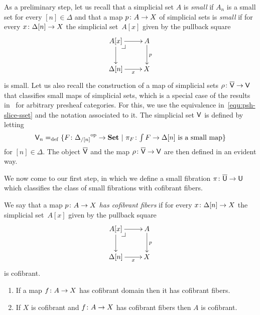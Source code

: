 \documentclass[reqno,10pt,a4paper,oneside,draft]{amsart}
\begin{document}
As a preliminary step, let us recall that a simplicial set $A$ is \emph{small}  if $A_n$ is a small set for every $[n] \in \Delta$ and that a map $p \colon A \to X$ of simplicial sets is \emph{small} if for every $x \colon \Delta[n] 
\to X$ the simplicial set~$A[x]$ given by the pullback square
\[
\xymatrix{
A[x] \ar[r] \ar[d] \drpullback & A \ar[d]^{p} \\
\Delta[n] \ar[r]_-{x} & X }
\]
is small. Let us also recall the  construction of a map of simplicial sets $\rho \colon \overline{\mathsf{V}} \to \mathsf{V}$ that classifies
small maps of simplicial sets, which is a special case of the results in~\cite{hofmann-streicher-universes} for arbitrary presheaf categories.  For this, we use the equivalence in~\eqref{equ:psh-slice-sset} and the notation associated to it.
The simplicial set $\mathsf{V}$ is defined by letting
\[
\mathsf{V}_n =_{\operatorname{def}} \{ F \colon {\Delta_{/[n]}}^{\operatorname{op}} \to \mathbf{Set} \ | \ \pi_F \colon \textstyle{\int F} \to \Delta[n] \text{ is a small
map} \}
\]
for $[n] \in \Delta$. The object $\overline{\mathsf{V}}$ and the map $\rho \colon \overline{\mathsf{V}} \to \mathsf{V}$ are then defined in an evident way. 


\bigskip

We now come to our first step, in which we define a small fibration $\pi \colon \overline{\mathsf{U}} \to \mathsf{U}$ which 
classifies the class of small fibrations with cofibrant fibers. 

\begin{definition} We say that a map $p \colon A \to X$ \emph{has cofibrant fibers} if for every $x \colon \Delta[n] 
\to X$ the simplicial set~$A[x]$ given by the pullback square
\[
\xymatrix{
A[x] \ar[r] \ar[d] \drpullback & A \ar[d]^{p} \\
\Delta[n] \ar[r]_-{x} & X }
\]
is cofibrant.
\end{definition}


\begin{lemma} \label{lem:Cofib_fiber} \hfill 
\begin{enumerate}[$(i)$]
\item If a map $f \colon A \rightarrow X$ has cofibrant domain then it has cofibrant fibers.
\item If $X$ is cofibrant and $f \colon A \rightarrow X$ has cofibrant fibers then $A$ is cofibrant.
\end{enumerate}
\end{lemma} 
\end{document}
